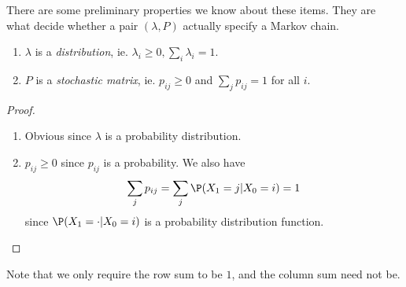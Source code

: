 \documentclass[a4paper]{article}
\begin{document}
There are some preliminary properties we know about these items. They are what decide whether a pair $(\lambda, P)$ actually specify a Markov chain.
\begin{prop}\leavevmode
  \begin{enumerate}
    \item $\lambda$ is a \emph{distribution}, ie. $\lambda_i \geq 0, \sum_i \lambda_i = 1$.
    \item $P$ is a \emph{stochastic matrix}, ie. $p_{ij} \geq 0$ and $\sum_j p_{ij} = 1$ for all $i$.
  \end{enumerate}
\end{prop}

\begin{proof}\leavevmode
  \begin{enumerate}
    \item Obvious since $\lambda$ is a probability distribution.
    \item $p_{ij} \geq 0$ since $p_{ij}$ is a probability. We also have
      \[
        \sum_j p_{ij} = \sum_j \P(X_{1} = j | X_0 = i) = 1
      \]
      since $\P(X_1 = \cdot | X_0 = i)$ is a probability distribution function.
  \end{enumerate}
\end{proof}
Note that we only require the row sum to be $1$, and the column sum need not be.
\end{document}
